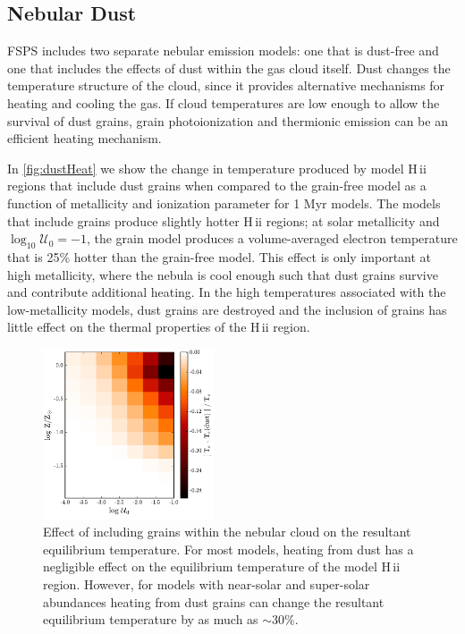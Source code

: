 \documentclass[trackchanges, twocolumn, tighten]{aastex61}
\newcommand{\Fig}[1]{\autoref{fig:#1}}
\newcommand{\FSPS}{{\sc FSPS}\xspace}
\newcommand{\logten}{\ensuremath{\log_{10}}}
\newcommand{\hii}{H\,{\sc ii}\xspace}
\newcommand{\logU}{\ensuremath{\logten \mathcal{U}_0}}
\begin{document}
\subsection{Nebular Dust}\label{sec:secondary:dust}

\FSPS includes two separate nebular emission models: one that is dust-free and one that includes the effects of dust within the gas cloud itself. Dust changes the temperature structure of the cloud, since it provides alternative mechanisms for heating and cooling the gas. If cloud temperatures are low enough to allow the survival of dust grains, grain photoionization and thermionic emission can be an efficient heating mechanism. 

In \Fig{dustHeat} we show the change in temperature produced by model \hii regions that include dust grains when compared to the grain-free model as a function of metallicity and ionization parameter for 1 Myr models. The models that include grains produce slightly hotter \hii regions; at solar metallicity and $\logU = -1$, the grain model produces a volume-averaged electron temperature that is 25\% hotter than the grain-free model. This effect is only important at high metallicity, where the nebula is cool enough such that dust grains survive and contribute additional heating. In the high temperatures associated with the low-metallicity models, dust grains are destroyed and the inclusion of grains has little effect on the thermal properties of the \hii region. 

\begin{figure}
  \begin{centering}
    \includegraphics[width=0.45\textwidth]{f28.pdf}
    \caption{Effect of including grains within the nebular cloud on the resultant equilibrium temperature. For most models, heating from dust has a negligible effect on the equilibrium temperature of the model \hii region. However, for models with near-solar and super-solar abundances heating from dust grains can change the resultant equilibrium temperature by as much as ${\sim}30\%$.}
    \label{fig:dustHeat}
  \end{centering}
\end{figure}
\end{document}
